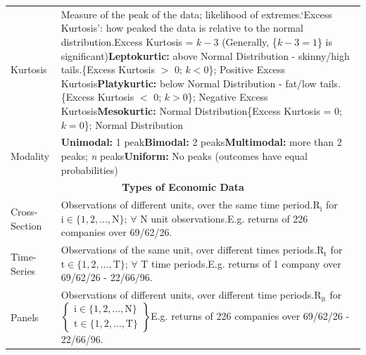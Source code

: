\documentclass[11pt, english]{article}
\begin{document}
\begin{center}
\begin{longtable}{p{3cm}p{9cm}}
			Kurtosis & Measure of the peak of the data; likelihood of extremes.\newline `Excess Kurtosis’: how peaked the data is relative to the normal distribution.\newline Excess Kurtosis = $k-3$ (Generally, \{$k-3=1$\} is significant)\newline \textbf{Leptokurtic: }above Normal Distribution - skinny/high tails.\newline \{Excess Kurtosis $>$ 0; $k<0$\}; Positive Excess Kurtosis\newline \textbf{Platykurtic: }below Normal Distribution - fat/low tails.\newline \{Excess Kurtosis $<$ 0; $k>0$\}; Negative Excess Kurtosis\newline \textbf{Mesokurtic: }Normal Distribution\newline \{Excess Kurtosis = 0; $k=0$\}; Normal Distribution\\
			Modality & \textbf{Unimodal: }1 peak\newline \textbf{Bimodal: }2 peaks\newline \textbf{Multimodal: }more than 2 peaks; \textit{n} peaks\newline \textbf{Uniform: }No peaks (outcomes have equal probabilities)\\
			\hline
			\hline
			\multicolumn{2}{c}{\textbf{Types of Economic Data}}\\
			\hline
			\hline
			Cross-Section & Observations of different units, over the same time period.\newline $\mathrm{R_i}$ for $\mathrm{i\in\{1,2,...,N\}}$; $\forall$ N unit observations.\newline E.g. returns of 226 companies over 69/62/26.\\
			Time-Series & Observations of the same unit, over different times periods.\newline $\mathrm{R_t}$ for $\mathrm{t\in\{1,2, ...,T\}}$; $\forall$ T time periods.\newline E.g. returns of 1 company over 69/62/26 - 22/66/96.\\
			Panels & Observations of different units, over different time periods.\newline $\mathrm{R_{it}}$ for $\mathrm{\begin{Bmatrix}i\in\{1,2,...,N\}\\t\in\{1,2, ...,T\}\end{Bmatrix}}$\newline E.g. returns of 226 companies over 69/62/26 - 22/66/96.\\
			\hline
		\end{longtable}
		\end{center}
\end{document}
